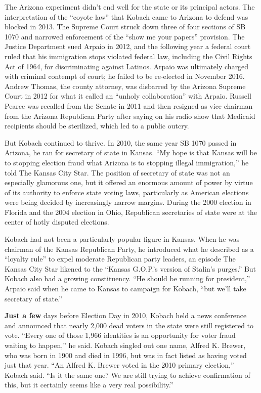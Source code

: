 The Arizona experiment didn't end well for the state or its principal
actors. The interpretation of the ``coyote law'' that Kobach came to
Arizona to defend was blocked in 2013. The Supreme Court struck down
three of four sections of SB 1070 and narrowed enforcement of the ``show
me your papers'' provision. The Justice Department sued Arpaio in 2012,
and the following year a federal court ruled that his immigration stops
violated federal law, including the Civil Rights Act of 1964, for
discriminating against Latinos. Arpaio was ultimately charged with
criminal contempt of court; he failed to be re-elected in November 2016.
Andrew Thomas, the county attorney, was disbarred by the Arizona Supreme
Court in 2012 for what it called an ``unholy collaboration'' with
Arpaio. Russell Pearce was recalled from the Senate in 2011 and then
resigned as vice chairman from the Arizona Republican Party after saying
on his radio show that Medicaid recipients should be sterilized, which
led to a public outcry.

But Kobach continued to thrive. In 2010, the same year SB 1070 passed in
Arizona, he ran for secretary of state in Kansas. ``My hope is that
Kansas will be to stopping election fraud what Arizona is to stopping
illegal immigration,'' he told The Kansas City Star. The position of
secretary of state was not an especially glamorous one, but it offered
an enormous amount of power by virtue of its authority to enforce state
voting laws, particularly as American elections were being decided by
increasingly narrow margins. During the 2000 election in Florida and the
2004 election in Ohio, Republican secretaries of state were at the
center of hotly disputed elections.

Kobach had not been a particularly popular figure in Kansas. When he was
chairman of the Kansas Republican Party, he introduced what he described
as a ``loyalty rule'' to expel moderate Republican party leaders, an
episode The Kansas City Star likened to the ``Kansas G.O.P.'s version of
Stalin's purges.'' But Kobach also had a growing constituency. ``He
should be running for president,'' Arpaio said when he came to Kansas to
campaign for Kobach, ``but we'll take secretary of state.''

\textbf{Just a few} days before Election Day in 2010, Kobach held a news
conference and announced that nearly 2,000 dead voters in the state were
still registered to vote. ``Every one of those 1,966 identities is an
opportunity for voter fraud waiting to happen,'' he said. Kobach singled
out one name, Alfred K. Brewer, who was born in 1900 and died in 1996,
but was in fact listed as having voted just that year. ``An Alfred K.
Brewer voted in the 2010 primary election,'' Kobach said. ``Is it the
same one? We are still trying to achieve confirmation of this, but it
certainly seems like a very real possibility.''

